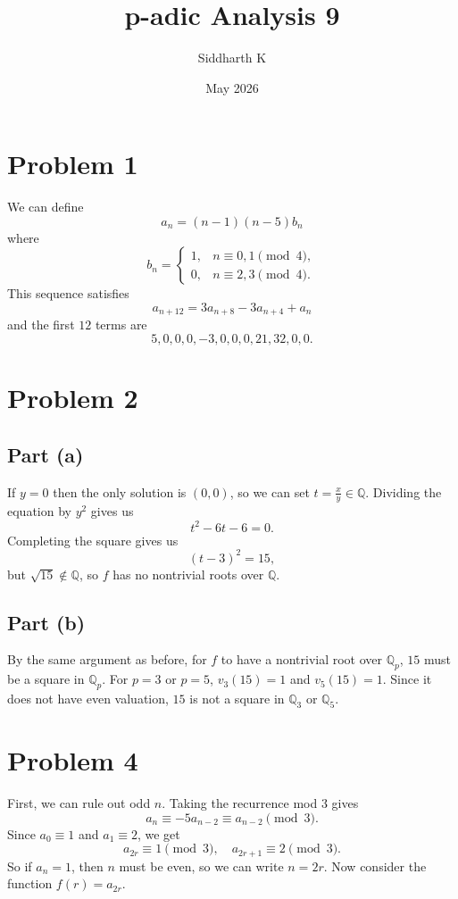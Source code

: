 \documentclass{article}
\title{p-adic Analysis 9}
\author{Siddharth K}
\date{May 2026}
\newcommand{\Q}{\mathbb{Q}}
\begin{document}
\maketitle

\section*{Problem 1}
We can define
$$a_n = (n - 1)(n - 5)b_n$$
where
$$b_n = \begin{cases}1, & n \equiv 0, 1 \pmod{4},\\0, & n \equiv 2, 3 \pmod{4}.\end{cases}$$
This sequence satisfies
$$a_{n + 12} = 3a_{n + 8} - 3a_{n + 4} + a_n$$
and the first $12$ terms are
$$5, 0, 0, 0, -3, 0, 0, 0, 21, 32 ,0, 0.$$

\section*{Problem 2}
\subsection*{Part (a)}
If $y = 0$ then the only solution is $(0, 0)$, so we can set $t = \frac{x}{y} \in \Q$. Dividing the equation by $y^2$ gives us
$$t^2 - 6t - 6 = 0.$$
Completing the square gives us
$$(t - 3)^2 = 15,$$
but $\sqrt{15} \notin \Q$, so $f$ has no nontrivial roots over $\Q$.

\subsection*{Part (b)}
By the same argument as before, for $f$ to have a nontrivial root over $\Q_p$, $15$ must be a square in $\Q_p$. For $p = 3$ or $p = 5$, $v_3(15) = 1$ and $v_5(15) = 1$. Since it does not have even valuation, $15$ is not a square in $\Q_3$ or $\Q_5$.

\section*{Problem 4}
First, we can rule out odd $n$. Taking the recurrence mod 3 gives
$$a_n \equiv -5a_{n - 2} \equiv a_{n - 2} \pmod{3}.$$
Since $a_0 \equiv 1$ and $a_1 \equiv 2$, we get
$$a_{2r} \equiv 1 \pmod{3}, \quad a_{2r + 1} \equiv 2 \pmod{3}.$$
So if $a_n = 1$, then $n$ must be even, so we can write $n = 2r$. Now consider the function $f(r) = a_{2r}$.
\end{document}
